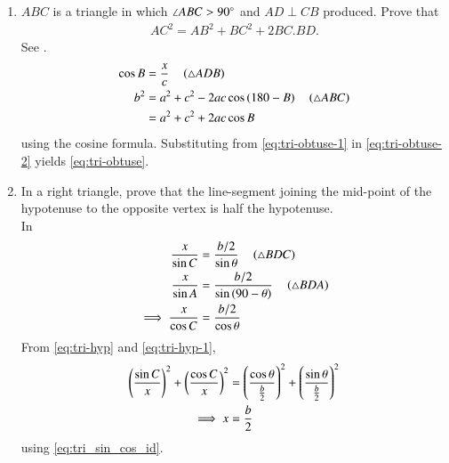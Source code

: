 \begin{enumerate}[label=\thesubsection.\arabic*.,ref=\thesubsection.\theenumi]
%
\item  $ABC$ is a triangle in which  $\angle  ABC > 90\degree$ and $AD  \perp  CB$ produced. Prove that
\begin{align}
	\label{eq:tri-obtuse}
 AC^2= AB^2 + BC^2 + 2 BC . BD.
\end{align}
\solution
	See .	
\begin{align}
	\label{eq:tri-obtuse-1}
	\cos B &= \frac{x}{c} \quad \left(\triangle ADB\right)
	\\
	b^2 &= a^2 + c^2 -2ac \cos \left(180-B\right) \quad \left(\triangle ABC\right)
	\\
	&= a^2 + c^2 +2ac \cos B 
	\label{eq:tri-obtuse-2}
\end{align}
using the cosine formula.
Substituting from 
	\eqref{eq:tri-obtuse-1}
	in
	\eqref{eq:tri-obtuse-2}
	yields 
	\eqref{eq:tri-obtuse}.
\begin{figure}[H]
	\begin{center}
			\resizebox{0.6\columnwidth}{!}{}
	\end{center}
	\caption{}
	\label{fig:tri-obtuse}	
\end{figure}
\item In a right triangle, prove that the line-segment joining the mid-point of the hypotenuse to the opposite vertex is half the hypotenuse.
	\\
	\solution
	In 	
\begin{align}
	\label{eq:tri-hyp}	
	\frac{x}{\sin C} &= \frac{b/2}{\sin \theta} \quad \left(\triangle BDC\right)
	\\
	\frac{x}{\sin A} &= \frac{b/2}{\sin \left(90-\theta\right)} \quad \left(\triangle BDA\right)
	\\
\implies	\frac{x}{\cos C} &= \frac{b/2}{\cos \theta} 
	\label{eq:tri-hyp-1}	
\end{align}
From 
	\eqref{eq:tri-hyp}	
	and
	\eqref{eq:tri-hyp-1},
\begin{align}
	\left(\frac{\sin C}{x}\right)^2
	+
	\left(\frac{\cos C}{x}\right)^2
	&= 
	\left(\frac{\cos \theta}{\frac{b}{2}}\right)^2
	+
	\left(\frac{\sin \theta}{\frac{b}{2}}\right)^2
	\\
	\implies x &= \frac{b}{2} 
\end{align}
using \eqref{eq:tri_sin_cos_id}.
\begin{figure}[H]
	\begin{center}
			\resizebox{0.6\columnwidth}{!}{}
	\end{center}
	\caption{}
	\label{fig:tri-hyp}	
\end{figure}

\end{enumerate}
